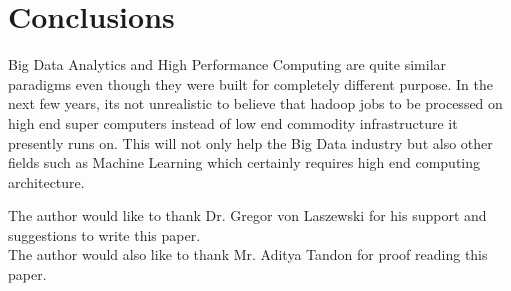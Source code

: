 \documentclass[sigconf]{acmart}
\begin{document}
\section{Conclusions}

Big Data Analytics and High Performance Computing are quite similar paradigms even though they were built for completely different purpose. In the next few years, its not unrealistic to believe that hadoop jobs to be processed on high end super computers instead of low end commodity infrastructure it presently runs on. This will not only help the Big Data industry but also other fields such as Machine Learning which certainly requires high end computing architecture. 


\appendix

\begin{acks}

 The author would like to thank Dr. Gregor von Laszewski for his support and suggestions to write this paper.
 \\
 The author would also like to thank Mr. Aditya Tandon for proof reading this paper.
\\
\end{acks}


 


\end{document}
